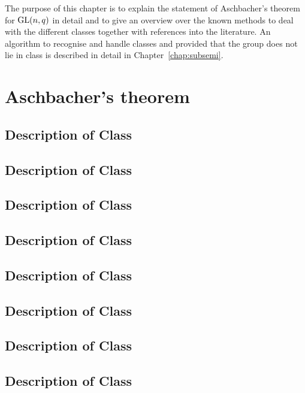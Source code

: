 The purpose of this chapter is to explain the statement of Aschbacher's 
theorem for $\GL(n,q)$ in detail and to give an overview over the known
methods to deal with the different classes together with references into
the literature. An algorithm to recognise and handle classes  and 
provided that the group does not lie in class  is described in detail
in Chapter~\ref{chap:subsemi}.

\section{Aschbacher's theorem}
\label{sect:aschbacher}

\subsection{Description of Class }
\label{descC1}

\subsection{Description of Class }
\label{descC2}

\subsection{Description of Class }
\label{descC3}

\subsection{Description of Class }
\label{descC4}

\subsection{Description of Class }
\label{descC5}

\subsection{Description of Class }
\label{descC6}

\subsection{Description of Class }
\label{descC7}

\subsection{Description of Class }
\label{descC8}


